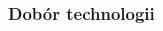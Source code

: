 \documentclass[aspectratio=169]{beamer}
\begin{document}
\begin{frame} %
    \frametitle{Dobór technologii} %
    
    \begin{columns}
        \begin{column}{0.33\textwidth}
            \begin{figure}
                \centering
            \end{figure}
            \begin{figure}
            \centering
            \end{figure}
        \end{column}
        \begin{column}{0.33\textwidth}

\end{column}
\end{columns}
\end{frame}
\end{document}
